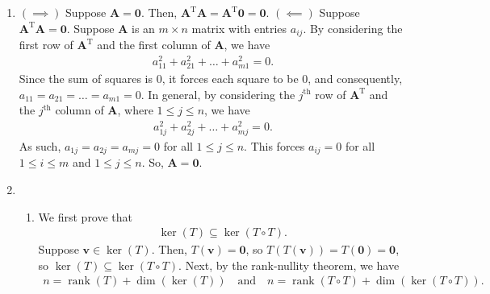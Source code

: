 \documentclass[12pt]{article}
\begin{document}
\begin{enumerate}[label=\textbf{(\alph*)}]
    \itemsep 0em
    \item $(\implies)$ Suppose $\mathbf{A}=\mathbf{0}$. Then, $\mathbf{A}^\text{T}\mathbf{A}=\mathbf{A}^\text{T}\mathbf{0}=\mathbf{0}$.
    \newline
    \newline $(\impliedby)$ Suppose $\mathbf{A}^\text{T}\mathbf{A}=\mathbf{0}$. Suppose $\mathbf{A}$ is an $m\times n$ matrix with entries $a_{ij}$. By considering the first row of $\mathbf{A}^\text{T}$ and the first column of $\mathbf{A}$, we have \begin{align*}
        a_{11}^2+a_{21}^2+\ldots+a_{m1}^2=0.
    \end{align*}
    Since the sum of squares is 0, it forces each square to be 0, and consequently, $a_{11}=a_{21}=\ldots=a_{m1}=0$.
    \newline
    \newline In general, by considering the $j^\text{th}$ row of $\mathbf{A}^\text{T}$ and the $j^\text{th}$ column of $\mathbf{A}$, where $1\le j \le n$, we have \begin{align*}
        a_{1j}^2+a_{2j}^2+\ldots+a_{mj}^2=0.
    \end{align*}
    As such, $a_{1j}=a_{2j}=a_{mj}=0$ for all $1\le j \le n$. This forces $a_{ij}=0$ for all $1\le i \le m$ and $1\le j \le n$. So, $\mathbf{A}=\mathbf{0}$.
    \item \begin{enumerate}[label=\textbf{(\roman*)}]
        \itemsep 0em
        \item We first prove that \begin{align*}
            \operatorname{ker}\left(T\right)\subseteq \operatorname{ker}\left(T\circ T\right).
        \end{align*}
        Suppose $\mathbf{v}\in \operatorname{ker}\left(T\right)$. Then, $T\left(\mathbf{v}\right)=\mathbf{0}$, so $T\left(T\left(\mathbf{v}\right)\right)=T\left(\mathbf{0}\right)=\mathbf{0}$, so $\operatorname{ker}\left(T\right)\subseteq \operatorname{ker}\left(T\circ T\right)$. 
        \newline
        \newline Next, by the rank-nullity theorem, we have \begin{align*}
            n=\operatorname{rank}\left(T\right)+\operatorname{dim}\left(\operatorname{ker}\left(T\right)\right)\quad\text{and}\quad n=\operatorname{rank}\left(T\circ T\right)+\operatorname{dim}\left(\operatorname{ker}\left(T\circ T\right)\right).

\end{align*}
\end{enumerate}
\end{enumerate}
\end{document}
